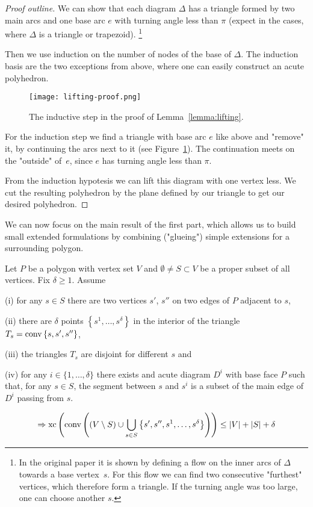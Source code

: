 \begin{proof}[Proof outline]
  We can show that each diagram $\Delta$ has a triangle formed by two main arcs and one base arc $e$ with turning angle less than $\pi$ (expect in the cases, where $\Delta$ is a triangle or trapezoid). \footnote{In the original paper it is shown by defining a flow on the inner arcs of $\Delta$ towards a base vertex~$s$. For this flow we can find two consecutive "furthest" vertices, which therefore form a triangle. If the turning angle was too large, one can choose another $s$.}

  Then we use induction on the number of nodes of the base of $\Delta$. The induction basis are the two exceptions from above, where one can easily construct an acute polyhedron.

  \begin{figure}[h]
    \centering
    \texttt{[image: lifting-proof.png]}
    \caption{The inductive step in the proof of Lemma~\ref{lemma:lifting}. \cite[Figure 2]{shitov2020sublinear}}
    \label{fig:lifting-proof}
  \end{figure}

  For the induction step we find a triangle with base arc $e$ like above and "remove" it, by continuing the arcs next to it (see Figure~\ref{fig:lifting-proof}). The continuation meets on the "outside" of~$e$, since $e$ has turning angle less than $\pi$. 

  From the induction hypotesis we can lift this diagram with one vertex less. We cut the resulting polyhedron by the plane defined by our triangle to get our desired polyhedron.
\end{proof}

We can now focus on the main result of the first part, which allows us to build small extended formulations by combining ("glueing") simple extensions for a surrounding polygon.

\begin{theorem}\label{theorem:glueing}
  Let $P$ be a polygon with vertex set $V$ and $\emptyset \neq S \subset V$ be a proper subset of all vertices. Fix $\delta \geq 1$. Assume

  (i) for any $s \in S$ there are two vertices $s'$, $s''$ on two edges of $P$ adjacent to $s$,

  (ii) there are $\delta$ points $\left\{s^1, \dots, s^\delta \right\}$ in the interior of the triangle ${T_s = \operatorname{conv} \left\{s,s',s''\right\}}$,
  
  (iii) the triangles $T_s$ are disjoint for different $s$ and

  (iv) for any $i \in \{1,\dots,\delta\}$ there exists and acute diagram $D^i$ with base face $P$ such that, for any $s \in S$, the segment between $s$ and $s^i$ is a subset of the main edge of $D^i$ passing from $s$. 
  
  $$\Rightarrow \operatorname{xc}\left( \operatorname{conv}\left( (V \setminus S) \cup \bigcup_{s \in S} \left\{ s',s'',s^1,\dots,s^\delta \right\}  \right) \right) \leq \lvert V\rvert + \lvert S\rvert + \delta$$
\end{theorem}

